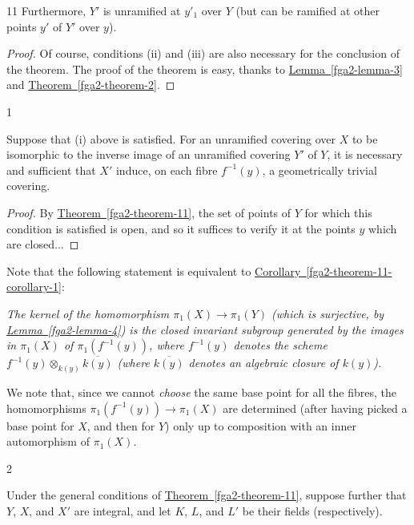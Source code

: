 \begin{theorem}{11}
    Furthermore, \(Y'\) is unramified at \(y'_1\) over \(Y\) (but can be ramified at other points \(y'\) of \(Y'\) over \(y\)).\begin{proof}\par{}Of course, conditions (ii) and (iii) are also necessary for the conclusion of the theorem.
      The proof of the theorem is easy, thanks to \hyperref[fga2-lemma-3]{Lemma~\ref*{fga2-lemma-3}} and \hyperref[fga2-theorem-2]{Theorem~\ref*{fga2-theorem-2}}.\end{proof}\end{theorem}\begin{corollary}{1}\label{fga2-theorem-11-corollary-1}\skipsinglepar\par{}Suppose that (i) above is satisfied.
    For an unramified covering over \(X\) to be isomorphic to the inverse image of an unramified covering \(Y'\) of \(Y\), it is necessary and sufficient that \(X'\) induce, on each fibre \(f^{-1}(y)\), a geometrically trivial covering.\begin{proof}\par{}By \hyperref[fga2-theorem-11]{Theorem~\ref*{fga2-theorem-11}}, the set of points of \(Y\) for which this condition is satisfied is open, and so it suffices to verify it at the points \(y\) which are closed...\end{proof}\end{corollary}\par{}Note that the following statement is equivalent to \hyperref[fga2-theorem-11-corollary-1]{Corollary~\ref*{fga2-theorem-11-corollary-1}}:\par{}\emph{The kernel of the homomorphism \(\pi _1(X)\to \pi _1(Y)\) (which is surjective, by \hyperref[fga2-lemma-4]{Lemma~\ref*{fga2-lemma-4}}) is the closed invariant subgroup generated by the images in \(\pi _1(X)\) of \(\pi _1(f^{-1}(y))\), where \(f^{-1}(y)\) denotes the scheme \(f^{-1}(y)\otimes _{k(y)}\overline {k(y)}\) (where \(\overline {k(y)}\) denotes an algebraic closure of \(k(y)\)).}\par{}We note that, since we cannot \emph{choose} the same base point for all the fibres, the homomorphisms \(\pi _1(f^{-1}(y))\to \pi _1(X)\) are determined (after having picked a base point for \(X\), and then for \(Y\)) only up to composition with an inner automorphism of \(\pi _1(X)\).\begin{corollary}{2}\label{fga2-theorem-11-corollary-2}\skipsinglepar\par{}Under the general conditions of \hyperref[fga2-theorem-11]{Theorem~\ref*{fga2-theorem-11}}, suppose further that \(Y\), \(X\), and \(X'\) are integral, and let \(K\), \(L\), and \(L'\) be their fields (respectively).

\end{corollary}
